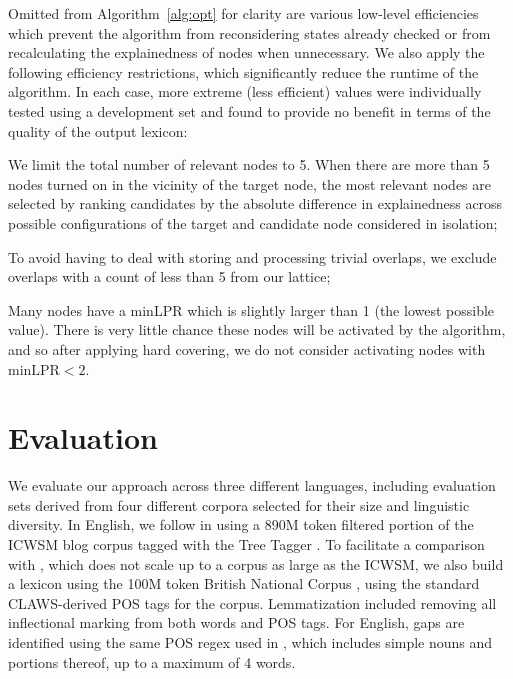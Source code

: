 \documentclass[11pt,letterpaper]{article}
\newcommand{\minLPR}{\ensuremath{\text{minLPR}}}
\newcommand{\algoref}[2][]{Algorithm#1~\ref{#2}\xspace}
\begin{document}
Omitted from \algoref{alg:opt} for clarity are various low-level efficiencies which prevent the algorithm from reconsidering states already checked or from recalculating the explainedness of nodes when unnecessary. We also apply the following efficiency restrictions, which significantly reduce the runtime of the algorithm. In each case, more extreme (less efficient) values were individually tested using a development set and found to provide no benefit in terms of the quality of the output lexicon:
\begin{compactitem}
\item We limit the total number of relevant nodes to 5. When there are more than 5 nodes turned on in the vicinity of the target node, the most relevant nodes are selected by ranking candidates by the absolute difference in explainedness across possible configurations of the target and candidate node considered in isolation;
\item To avoid having to deal with storing and processing trivial overlaps, we exclude overlaps with a count of less than 5 from our lattice;
\item Many nodes have a minLPR which is slightly larger than 1 (the lowest possible value). There is very little chance these nodes will be activated by the algorithm, and so after applying hard covering, we do not consider activating nodes with $\minLPR < 2$.
\end{compactitem}

\section{Evaluation}
\label{sec:evaluation}

We evaluate our approach across three different languages, including evaluation sets derived from four different corpora selected for their size and linguistic diversity. In English, we follow  in using a 890M token filtered portion of the ICWSM blog corpus \cite{ICWSM} tagged with the Tree Tagger \cite{Schmid95}. To facilitate a comparison with , which does not scale up to a corpus as large as the ICWSM, we also build a lexicon using the 100M token British National Corpus \cite{BNC}, using the standard CLAWS-derived POS tags for the corpus. Lemmatization included removing all inflectional marking from both words and POS tags. For English, gaps are identified using the same POS regex used in , which includes simple nouns and portions thereof, up to a maximum of 4 words.
\end{document}
